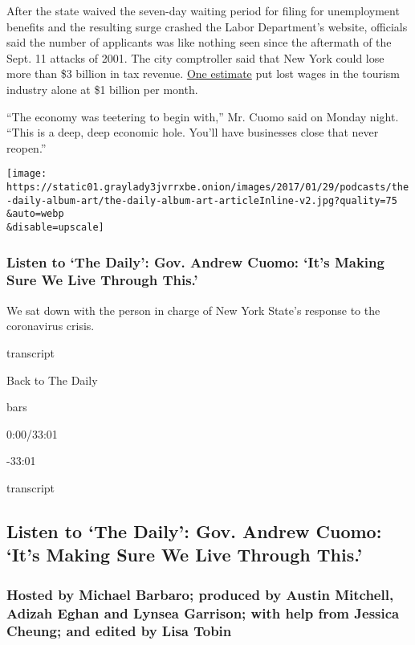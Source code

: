 After the state waived the seven-day waiting period for filing for
unemployment benefits and the resulting surge crashed the Labor
Department's website, officials said the number of applicants was like
nothing seen since the aftermath of the Sept. 11 attacks of 2001. The
city comptroller said that New York could lose more than \$3 billion in
tax revenue.
\href{https://www.nytimes3xbfgragh.onion/2020/03/16/nyregion/Coronavirus-nyc-economy-.html}{One
estimate} put lost wages in the tourism industry alone at \$1 billion
per month.

``The economy was teetering to begin with,'' Mr. Cuomo said on Monday
night. ``This is a deep, deep economic hole. You'll have businesses
close that never reopen.''

\texttt{[image: https://static01.graylady3jvrrxbe.onion/images/2017/01/29/podcasts/the-daily-album-art/the-daily-album-art-articleInline-v2.jpg?quality=75\\\&auto=webp\\\&disable=upscale]}

\hypertarget{listen-to-the-daily-gov-andrew-cuomo-its-making-sure-we-live-through-this}{%
\subsubsection{Listen to `The Daily': Gov. Andrew Cuomo: `It's Making
Sure We Live Through
This.'}\label{listen-to-the-daily-gov-andrew-cuomo-its-making-sure-we-live-through-this}}

We sat down with the person in charge of New York State's response to
the coronavirus crisis.

transcript

Back to The Daily

bars

0:00/33:01

-33:01

transcript

\hypertarget{listen-to-the-daily-gov-andrew-cuomo-its-making-sure-we-live-through-this-1}{%
\subsection{Listen to `The Daily': Gov. Andrew Cuomo: `It's Making Sure
We Live Through
This.'}\label{listen-to-the-daily-gov-andrew-cuomo-its-making-sure-we-live-through-this-1}}

\hypertarget{hosted-by-michael-barbaro-produced-by-austin-mitchell-adizah-eghan-and-lynsea-garrison-with-help-from-jessica-cheung-and-edited-by-lisa-tobin}{%
\subsubsection{Hosted by Michael Barbaro; produced by Austin Mitchell,
Adizah Eghan and Lynsea Garrison; with help from Jessica Cheung; and
edited by Lisa
Tobin}\label{hosted-by-michael-barbaro-produced-by-austin-mitchell-adizah-eghan-and-lynsea-garrison-with-help-from-jessica-cheung-and-edited-by-lisa-tobin}}

